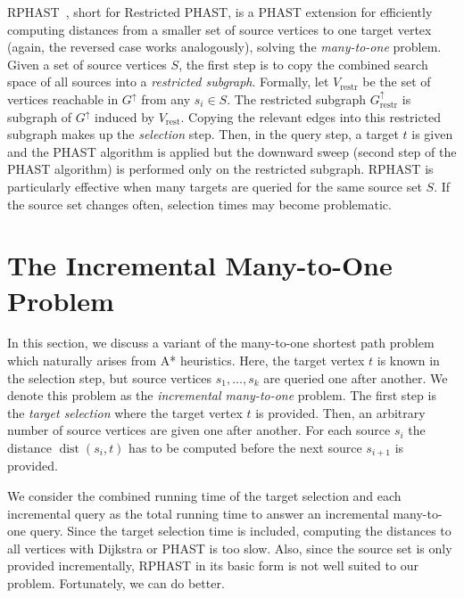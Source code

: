 \documentclass[manuscript,review]{acmart}
\newcommand*{\dist}{\operatorname{dist}}
\newcommand*{\gchu}{G^{\uparrow}}
\begin{document}
RPHAST~\cite{delling_et_al:OASIcs:2011:3266}, short for Restricted PHAST, is a PHAST extension for efficiently computing distances from a smaller set of source vertices to one target vertex (again, the reversed case works analogously), solving the \emph{many-to-one} problem.
Given a set of source vertices $S$, the first step is to copy the combined search space of all sources into a \emph{restricted subgraph}.
Formally, let $V_{\operatorname{restr}}$ be the set of vertices reachable in $\gchu$ from any $s_i \in S$.
The restricted subgraph $\gchu_{\operatorname{restr}}$ is subgraph of $\gchu$ induced by $V_{\operatorname{rest}}$.
Copying the relevant edges into this restricted subgraph makes up the \emph{selection} step.
Then, in the query step, a target $t$ is given and the PHAST algorithm is applied but the downward sweep (second step of the PHAST algorithm) is performed only on the restricted subgraph.
RPHAST is particularly effective when many targets are queried for the same source set $S$.
If the source set changes often, selection times may become problematic.

\section{The Incremental Many-to-One Problem}\label{sec:lazy-rphast}

In this section, we discuss a variant of the many-to-one shortest path problem which naturally arises from A* heuristics.
Here, the target vertex $t$ is known in the selection step, but source vertices $s_1,\dots,s_k$ are queried one after another.
We denote this problem as the \emph{incremental many-to-one} problem.
The first step is the \emph{target selection} where the target vertex $t$ is provided.
Then, an arbitrary number of source vertices are given one after another.
For each source $s_i$ the distance $\dist(s_i, t)$ has to be computed before the next source $s_{i+1}$ is provided.

We consider the combined running time of the target selection and each incremental query as the total running time to answer an incremental many-to-one query.
Since the target selection time is included, computing the distances to all vertices with Dijkstra or PHAST is too slow.
Also, since the source set is only provided incrementally, RPHAST in its basic form is not well suited to our problem.
Fortunately, we can do better.
\end{document}
